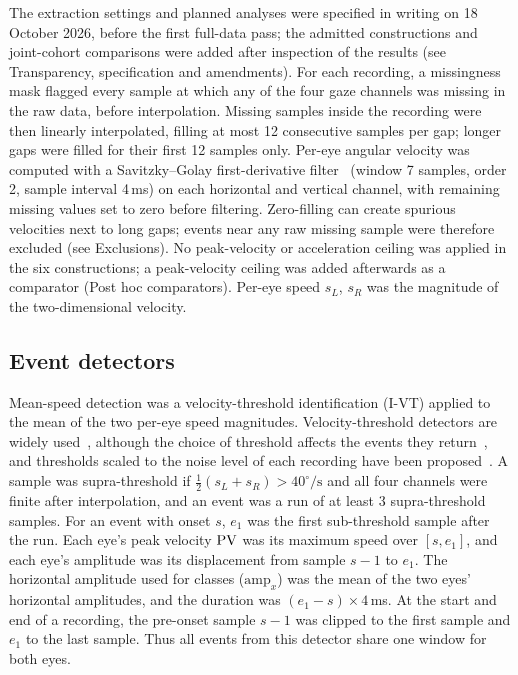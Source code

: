 The extraction settings and planned analyses were specified in writing on 18 October 2026, before the first full-data pass; the admitted constructions and joint-cohort comparisons were added after inspection of the results (see Transparency, specification and amendments). For each recording, a missingness mask flagged every sample at which any of the four gaze channels was missing in the raw data, before interpolation. Missing samples inside the recording were then linearly interpolated, filling at most 12 consecutive samples per gap; longer gaps were filled for their first 12 samples only. Per-eye angular velocity was computed with a Savitzky--Golay first-derivative filter~\citep{savitzky1964} (window 7 samples, order 2, sample interval 4\,ms) on each horizontal and vertical channel, with remaining missing values set to zero before filtering. Zero-filling can create spurious velocities next to long gaps; events near any raw missing sample were therefore excluded (see Exclusions). No peak-velocity or acceleration ceiling was applied in the six constructions; a peak-velocity ceiling was added afterwards as a comparator (Post hoc comparators). Per-eye speed $s_L$, $s_R$ was the magnitude of the two-dimensional velocity.

\subsection{Event detectors}

Mean-speed detection was a velocity-threshold identification (I-VT) applied to the mean of the two per-eye speed magnitudes. Velocity-threshold detectors are widely used~\citep{andersson2017,birawo2022}, although the choice of threshold affects the events they return~\citep{nystrom2010,ivtadapt2025}, and thresholds scaled to the noise level of each recording have been proposed~\citep{engbert2003}. A sample was supra-threshold if $\tfrac12(s_L + s_R) > 40^\circ/\mathrm{s}$ and all four channels were finite after interpolation, and an event was a run of at least 3 supra-threshold samples. For an event with onset $s$, $e_1$ was the first sub-threshold sample after the run. Each eye's peak velocity $\mathrm{PV}$ was its maximum speed over $[s, e_1]$, and each eye's amplitude was its displacement from sample $s-1$ to $e_1$. The horizontal amplitude used for classes ($\mathrm{amp}_x$) was the mean of the two eyes' horizontal amplitudes, and the duration was $(e_1 - s)\times 4$\,ms. At the start and end of a recording, the pre-onset sample $s-1$ was clipped to the first sample and $e_1$ to the last sample. Thus all events from this detector share one window for both eyes.

